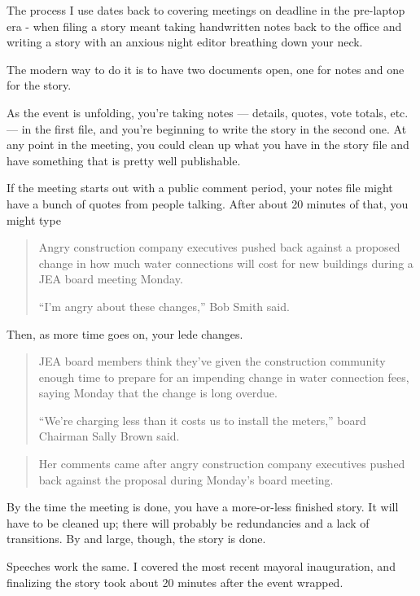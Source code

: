 \documentclass[
  11pt,
  american,
  letterpaperpaper,
  extrafontsizes,onecolumn,openright
  ]{memoir}
\begin{document}
The process I use dates back to covering meetings on deadline in the pre-laptop era - when filing a story meant taking handwritten notes back to the office and writing a story with an anxious night editor breathing down your neck.

The modern way to do it is to have two documents open, one for notes and one for the story.

As the event is unfolding, you're taking notes --- details, quotes, vote totals, etc. --- in the first file, and you're beginning to write the story in the second one. At any point in the meeting, you could clean up what you have in the story file and have something that is pretty well publishable.

If the meeting starts out with a public comment period, your notes file might have a bunch of quotes from people talking. After about 20 minutes of that, you might type

\begin{quote}
Angry construction company executives pushed back against a proposed change in how much water connections will cost for new buildings during a JEA board meeting Monday.

\enquote{I'm angry about these changes,} Bob Smith said.
\end{quote}

Then, as more time goes on, your lede changes.

\begin{quote}
JEA board members think they've given the construction community enough time to prepare for an impending change in water connection fees, saying Monday that the change is long overdue.

\enquote{We're charging less than it costs us to install the meters,} board Chairman Sally Brown said.
\end{quote}

\begin{quote}
Her comments came after angry construction company executives pushed back against the proposal during Monday's board meeting.
\end{quote}

By the time the meeting is done, you have a more-or-less finished story. It will have to be cleaned up; there will probably be redundancies and a lack of transitions. By and large, though, the story is done.

Speeches work the same. I covered the most recent mayoral inauguration, and finalizing the story took about 20 minutes after the event wrapped.
\end{document}

